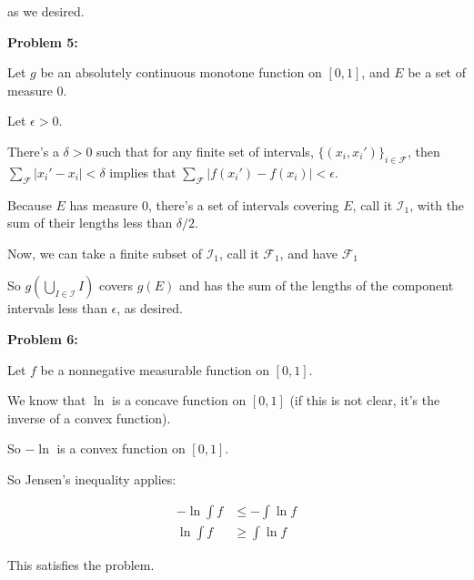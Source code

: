 \documentclass[a4paper,12pt]{article}
\newcommand{\shunt}{\vspace{20mm}}
\newcommand{\absval}[1]{\left\lvert #1 \right\rvert}
\newcommand{\de}{\delta}
\newcommand{\ep}{\epsilon}
\newcommand{\scrF}{\mathcal{F}}
\newcommand{\scrI}{\mathcal{I}}
\begin{document}
as we desired.

\shunt

{\bf Problem 5:} %

Let $g$ be an absolutely continuous monotone function on $[0,1]$, and $E$ be a set of measure $0$.

Let $\ep>0$.

There's a $\de>0$ such that for any finite set of intervals, $\{(x_i,x_i')\}_{i \in \scrF}$, then $\sum\limits_{\scrF} \absval{x_i' - x_i} < \de$ implies that $\sum\limits_{\scrF} \absval{f(x_i') - f(x_i)} < \ep$.

Because $E$ has measure $0$, there's a set of intervals covering $E$, call it $\scrI_1$, with the sum of their lengths less than $\de/2$.

Now, we can take a finite subset of $\scrI_1$, call it $\scrF_1$, and have $\scrF_1$ 


So $g(\bigcup\limits_{I \in \scrI} I)$ covers $g(E)$ and has the sum of the lengths of the component intervals less than $\ep$, as desired.

\shunt

{\bf Problem 6:} 

Let $f$ be a nonnegative measurable function on $[0,1]$.

We know that $\ln$ is a concave function on $[0,1]$ (if this is not clear, it's the inverse of a convex function).

So $-\ln$ is a convex function on $[0,1]$.

So Jensen's inequality applies:

\begin{align*}
-\ln \int f &\leq -\int\ln f \\
\ln \int f & \geq \int \ln f
\end{align*}

This satisfies the problem.

\shunt
\end{document}
